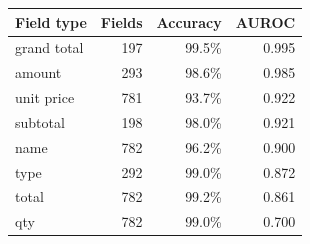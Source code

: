 \begin{tabular}{@{}lrrr@{}}
\toprule
Field type & Fields & Accuracy & AUROC \\
\midrule
grand total & 197 & 99.5\% & 0.995 \\
amount & 293 & 98.6\% & 0.985 \\
unit price & 781 & 93.7\% & 0.922 \\
subtotal & 198 & 98.0\% & 0.921 \\
name & 782 & 96.2\% & 0.900 \\
type & 292 & 99.0\% & 0.872 \\
total & 782 & 99.2\% & 0.861 \\
qty & 782 & 99.0\% & 0.700 \\
\bottomrule
\end{tabular}
